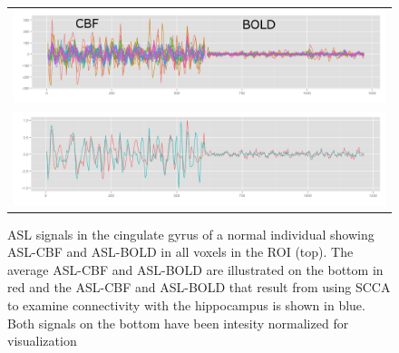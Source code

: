 \documentclass{llncs}
\begin{document}
\begin{figure}[tb]
\begin{center}
\begin{tabular}{ c }
\includegraphics[width=0.75\linewidth]{all_signals3.png}\\
\includegraphics[width=0.75\linewidth]{metric_signals.png} \\
\end{tabular}
\caption{ ASL signals in the cingulate gyrus of a normal individual showing ASL-CBF and ASL-BOLD in all voxels in the ROI (top). The average ASL-CBF and ASL-BOLD are illustrated on the bottom in red and the ASL-CBF and ASL-BOLD that result from using SCCA to examine connectivity with the hippocampus is shown in blue. Both signals on the bottom have been intesity normalized for visualization}
\label{fig:signals}
\end{center}
\end{figure}
\end{document}
